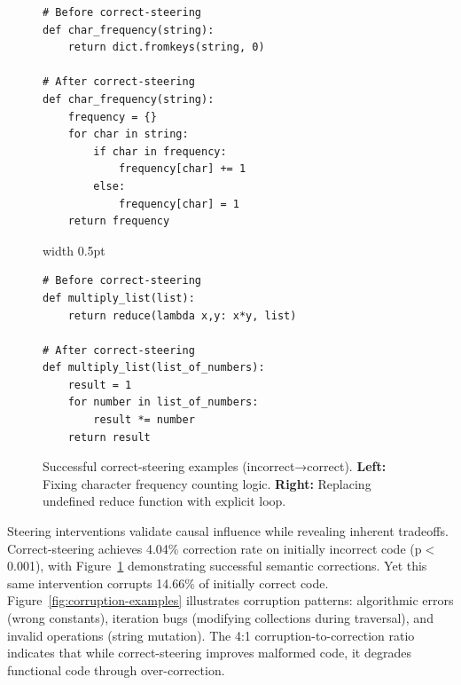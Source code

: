 \begin{figure}[!h]
\centering
\begin{minipage}[t]{0.45\linewidth}
\centering
\begin{verbatim}
# Before correct-steering
def char_frequency(string):
    return dict.fromkeys(string, 0)

# After correct-steering
def char_frequency(string):
    frequency = {}
    for char in string:
        if char in frequency:
            frequency[char] += 1
        else:
            frequency[char] = 1
    return frequency
\end{verbatim}
\end{minipage}
\hspace{0.3cm}
\vrule width 0.5pt
\hspace{0.3cm}
\begin{minipage}[t]{0.45\linewidth}
\centering
\begin{verbatim}
# Before correct-steering
def multiply_list(list):
    return reduce(lambda x,y: x*y, list)

# After correct-steering
def multiply_list(list_of_numbers):
    result = 1
    for number in list_of_numbers:
        result *= number
    return result
\end{verbatim}
\end{minipage}
\caption{Successful correct-steering examples (incorrect→correct). \textbf{Left:} Fixing character frequency counting logic. \textbf{Right:} Replacing undefined reduce function with explicit loop.}
\label{fig:correct-steering-examples}
\end{figure}

Steering interventions validate causal influence while revealing inherent tradeoffs. Correct-steering achieves 4.04\% correction rate on initially incorrect code (p$<$0.001), with Figure~\ref{fig:correct-steering-examples} demonstrating successful semantic corrections. Yet this same intervention corrupts 14.66\% of initially correct code. Figure~\ref{fig:corruption-examples} illustrates corruption patterns: algorithmic errors (wrong constants), iteration bugs (modifying collections during traversal), and invalid operations (string mutation). The 4:1 corruption-to-correction ratio indicates that while correct-steering improves malformed code, it degrades functional code through over-correction.

